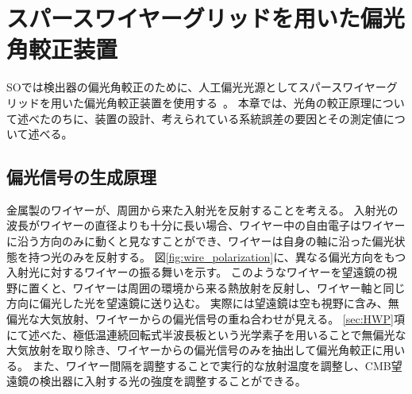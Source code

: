 \documentclass[../../main.tex]{subfiles}
\begin{document}
\chapter{スパースワイヤーグリッドを用いた偏光角較正装置}
SOでは検出器の偏光角較正のために、人工偏光光源としてスパースワイヤーグリッドを用いた偏光角較正装置を使用する~\cite{swg:Murata_2023}。
本章では、光角の較正原理について述べたのちに、装置の設計、考えられている系統誤差の要因とその測定値について述べる。

\section{偏光信号の生成原理}
金属製のワイヤーが、周囲から来た入射光を反射することを考える。
入射光の波長がワイヤーの直径よりも十分に長い場合、ワイヤー中の自由電子はワイヤーに沿う方向のみに動くと見なすことができ、ワイヤーは自身の軸に沿った偏光状態を持つ光のみを反射する。
図\ref{fig:wire_polarization}に、異なる偏光方向をもつ入射光に対するワイヤーの振る舞いを示す。
このようなワイヤーを望遠鏡の視野に置くと、ワイヤーは周囲の環境から来る熱放射を反射し、ワイヤー軸と同じ方向に偏光した光を望遠鏡に送り込む。
実際には望遠鏡は空も視野に含み、無偏光な大気放射、ワイヤーからの偏光信号の重ね合わせが見える。
\ref{sec:HWP}項にて述べた、極低温連続回転式半波長板という光学素子を用いることで無偏光な大気放射を取り除き、ワイヤーからの偏光信号のみを抽出して偏光角較正に用いる。
また、ワイヤー間隔を調整することで実行的な放射温度を調整し、CMB望遠鏡の検出器に入射する光の強度を調整することができる。
\end{document}
